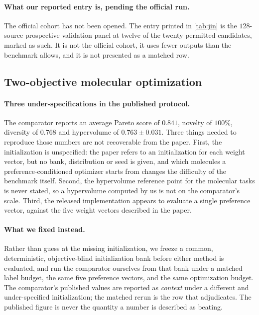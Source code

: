 \paragraph{What our reported entry is, pending the official run.}
The official cohort has not been opened. The entry printed in \cref{tab:jin} is the $128$-source prospective validation panel at twelve of the twenty permitted candidates, marked as such. It is not the official cohort, it uses fewer outputs than the benchmark allows, and it is not presented as a matched row.

\subsection{Two-objective molecular optimization}

\paragraph{Three under-specifications in the published protocol.}
The comparator reports an average Pareto score of $0.841$, novelty of $100\%$, diversity of $0.768$ and hypervolume of $0.763\pm0.031$. Three things needed to reproduce those numbers are not recoverable from the paper. First, the initialization is unspecified: the paper refers to an initialization for each weight vector, but no bank, distribution or seed is given, and which molecules a preference-conditioned optimizer starts from changes the difficulty of the benchmark itself. Second, the hypervolume reference point for the molecular tasks is never stated, so a hypervolume computed by us is not on the comparator's scale. Third, the released implementation appears to evaluate a single preference vector, against the five weight vectors described in the paper.

\paragraph{What we fixed instead.}
Rather than guess at the missing initialization, we freeze a common, deterministic, objective-blind initialization bank before either method is evaluated, and run the comparator ourselves from that bank under a matched label budget, the same five preference vectors, and the same optimization budget. The comparator's published values are reported as \emph{context} under a different and under-specified initialization; the matched rerun is the row that adjudicates. The published figure is never the quantity a \method{} number is described as beating.

